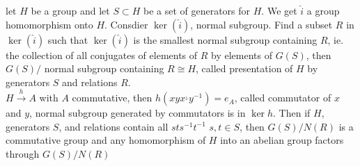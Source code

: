 \noindent
let $H$ be a group and let $S \subset H$ be a set of generators for $H$. We get $\hat{i}$ a group homomorphism onto $H$. Consdier $\ker(\hat{i})$, normal subgroup. Find a subset $R$ in $\ker(\hat{i})$ such that $\ker(\hat{i})$ is the smallest normal subgroup containing $R$, ie. the collection of all conjugates of elements of $R$ by elements of $G(S)$, then $G(S)/$ normal subgroup containing $R \cong H$, called presentation of $H$ by generators $S$ and relations $R$. \\

\noindent
$H \stackrel{h}{\to} A$ with $A$ commutative, then $h(xyx^{_1}y^{-1}) = e_A$, called commutator of $x$ and $y$, normal subgroup generated by commutators is in $\ker h$. Then if $H$, generators $S$, and relations contain all $sts^{-1}t^{-1}$ $s,t \in S$, then $G(S)/N(R)$ is a commutative group and any homomorphism of $H$ into an abelian group factors through $G(S)/N(R)$ 